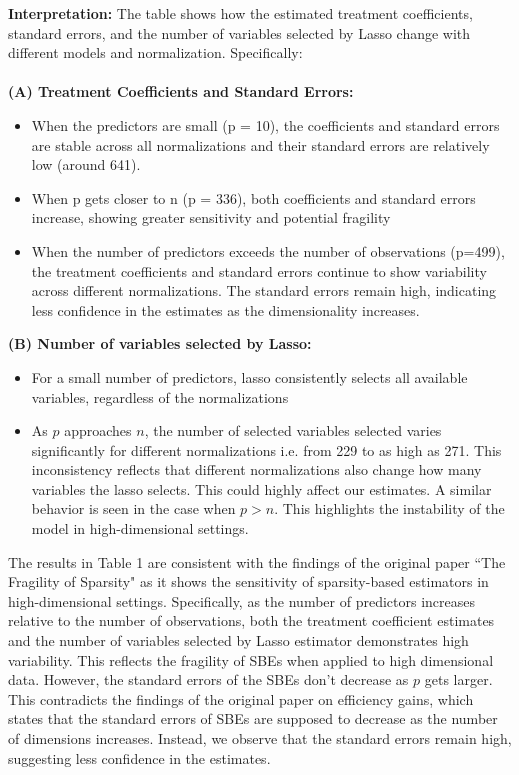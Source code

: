 \textbf{Interpretation:}
The table shows how the estimated treatment coefficients, standard errors, and the number of variables selected by Lasso change with different models and normalization. Specifically:\\
\\
\textbf{(A) Treatment Coefficients and Standard Errors:}
\begin{itemize}
    \item When the predictors are small (p = 10), the coefficients and standard errors are stable across all normalizations and their standard errors are relatively low (around 641).
    \item When p gets closer to n (p = 336), both coefficients and standard errors increase, showing greater sensitivity and potential fragility
    \item When the number of predictors exceeds the number of observations (p=499), the treatment coefficients and standard errors continue to show variability across different normalizations. The standard errors remain high, indicating less confidence in the estimates as the dimensionality increases. 

\end{itemize}

\textbf{(B) Number of variables selected by Lasso:}
\begin{itemize}
    \item For a small number of predictors, lasso consistently selects all available variables, regardless of the normalizations
    \item As $p$ approaches $n$, the number of selected variables selected varies significantly for different normalizations i.e. from 229 to as high as 271. This inconsistency reflects that different normalizations also change how many variables the lasso selects. This could highly affect our estimates. A similar behavior is seen in the case when $p>n$. This highlights the instability of the model in high-dimensional settings. 
\end{itemize}

The results in Table 1 are consistent with the findings of the original paper ``The Fragility of Sparsity" as it shows the sensitivity of sparsity-based estimators in high-dimensional settings. Specifically, as the number of predictors increases relative to the number of observations, both the treatment coefficient estimates and the number of variables selected by Lasso estimator demonstrates high variability. This reflects the fragility of SBEs when applied to high dimensional data. However, the standard errors of the SBEs don't decrease as $p$ gets larger. This contradicts the findings of the original paper on efficiency gains, which states that the standard errors of SBEs are supposed to decrease as the number of dimensions increases. Instead, we observe that the standard errors remain high, suggesting less confidence in the estimates. 